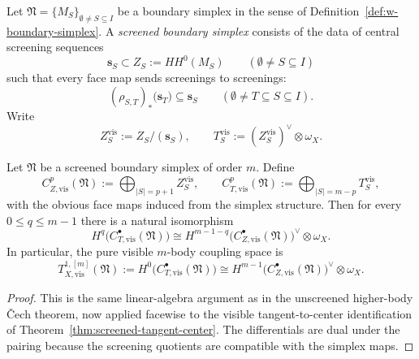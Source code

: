 \begin{definition}
\label{def:screened-boundary-simplex}
Let $\mathfrak N=\{M_S\}_{\emptyset\neq S\subseteq I}$ be a boundary simplex in the sense of
Definition~\ref{def:w-boundary-simplex}.
A \emph{screened boundary simplex} consists of the data of central screening sequences
\[
\mathbf s_S\subset Z_S:=HH^0(M_S)
\qquad (\emptyset\neq S\subseteq I)
\]
such that every face map sends screenings to screenings:
\[
(\rho_{S,T})_*\bigl(\mathbf s_T\bigr)\subseteq \mathbf s_S
\qquad (\emptyset\neq T\subseteq S\subseteq I).
\]
Write
\[
Z_S^{\mathrm{vis}}:=Z_S/(\mathbf s_S),
\qquad
T_S^{\mathrm{vis}}:=(Z_S^{\mathrm{vis}})^{\vee}\otimes \omega_X.
\]
\end{definition}

\begin{theorem}
\label{thm:screened-cech-duality}
Let $\mathfrak N$ be a screened boundary simplex of order $m$.
Define
\[
C_{Z,\mathrm{vis}}^p(\mathfrak N):=\bigoplus_{|S|=p+1} Z_S^{\mathrm{vis}},
\qquad
C_{T,\mathrm{vis}}^p(\mathfrak N):=\bigoplus_{|S|=m-p} T_S^{\mathrm{vis}},
\]
with the obvious face maps induced from the simplex structure.
Then for every $0\le q\le m-1$ there is a natural isomorphism
\[
H^q\bigl(C_{T,\mathrm{vis}}^{\bullet}(\mathfrak N)\bigr)
\cong
H^{m-1-q}\bigl(C_{Z,\mathrm{vis}}^{\bullet}(\mathfrak N)\bigr)^{\vee}\otimes \omega_X.
\]
In particular, the pure visible $m$-body coupling space is
\[
T_{X,\mathrm{vis}}^{1,[m]}(\mathfrak N)
:=H^0\bigl(C_{T,\mathrm{vis}}^{\bullet}(\mathfrak N)\bigr)
\cong
H^{m-1}\bigl(C_{Z,\mathrm{vis}}^{\bullet}(\mathfrak N)\bigr)^{\vee}\otimes \omega_X.
\]
\end{theorem}

\begin{proof}
This is the same linear-algebra argument as in the unscreened higher-body \v{C}ech theorem, now applied
facewise to the visible tangent-to-center identification of Theorem~\ref{thm:screened-tangent-center}.
The differentials are dual under the pairing because the screening quotients are compatible with the simplex maps.
\end{proof}

